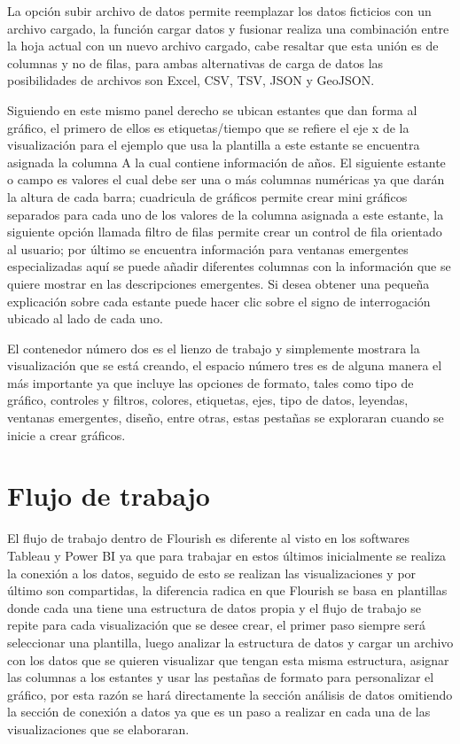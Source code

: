 \documentclass[
]{book}
\begin{document}
La opción subir archivo de datos permite reemplazar los datos ficticios con un archivo cargado, la función cargar datos y fusionar realiza una combinación entre la hoja actual con un nuevo archivo cargado, cabe resaltar que esta unión es de columnas y no de filas, para ambas alternativas de carga de datos las posibilidades de archivos son Excel, CSV, TSV, JSON y GeoJSON.

Siguiendo en este mismo panel derecho se ubican estantes que dan forma al gráfico, el primero de ellos es etiquetas/tiempo que se refiere el eje x de la visualización para el ejemplo que usa la plantilla a este estante se encuentra asignada la columna A la cual contiene información de años. El siguiente estante o campo es valores el cual debe ser una o más columnas numéricas ya que darán la altura de cada barra; cuadricula de gráficos permite crear mini gráficos separados para cada uno de los valores de la columna asignada a este estante, la siguiente opción llamada filtro de filas permite crear un control de fila orientado al usuario; por último se encuentra información para ventanas emergentes especializadas aquí se puede añadir diferentes columnas con la información que se quiere mostrar en las descripciones emergentes. Si desea obtener una pequeña explicación sobre cada estante puede hacer clic sobre el signo de interrogación ubicado al lado de cada uno.

El contenedor número dos es el lienzo de trabajo y simplemente mostrara la visualización que se está creando, el espacio número tres es de alguna manera el más importante ya que incluye las opciones de formato, tales como tipo de gráfico, controles y filtros, colores, etiquetas, ejes, tipo de datos, leyendas, ventanas emergentes, diseño, entre otras, estas pestañas se exploraran cuando se inicie a crear gráficos.

\hypertarget{flujo-de-trabajo-1}{%
\section{Flujo de trabajo}\label{flujo-de-trabajo-1}}

El flujo de trabajo dentro de Flourish es diferente al visto en los softwares Tableau y Power BI ya que para trabajar en estos últimos inicialmente se realiza la conexión a los datos, seguido de esto se realizan las visualizaciones y por último son compartidas, la diferencia radica en que Flourish se basa en plantillas donde cada una tiene una estructura de datos propia y el flujo de trabajo se repite para cada visualización que se desee crear, el primer paso siempre será seleccionar una plantilla, luego analizar la estructura de datos y cargar un archivo con los datos que se quieren visualizar que tengan esta misma estructura, asignar las columnas a los estantes y usar las pestañas de formato para personalizar el gráfico, por esta razón se hará directamente la sección análisis de datos omitiendo la sección de conexión a datos ya que es un paso a realizar en cada una de las visualizaciones que se elaboraran.
\end{document}
